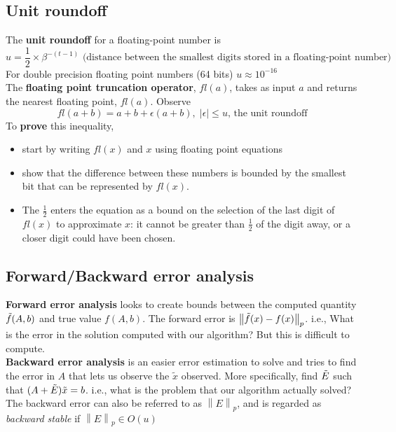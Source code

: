 \documentclass{article}
\newcommand{\norm}[2]{\left\lVert#1\right\rVert_#2}
\newcommand{\abs}[1]{\lvert#1\rvert}
\begin{document}
\subsection{Unit roundoff}
The \textbf{unit roundoff} for a floating-point number is 
\begin{equation*}
    u = \frac{1}{2} \times \beta^{-(t-1)} \textrm{ (distance between the smallest digits stored in a floating-point number)}
\end{equation*}
For double precision floating point numbers (64 bits) $u \approx 10^{-16}$\\
The \textbf{floating point truncation operator}, $fl(a)$, takes as input $a$ and returns the nearest floating point, $fl(a)$. Observe
\begin{equation*}
    fl(a+b) = a+b + \epsilon(a+b), \; \abs{\epsilon} \leq u \textrm{, the unit roundoff}
\end{equation*}
To \textbf{prove} this inequality, 
\begin{itemize} 
    \item start by writing $fl(x)$ and $x$ using floating point equations
    \item show that the difference between these numbers is bounded by the smallest bit that can be represented by $fl(x)$. 
    \item The $\frac{1}{2}$ enters the equation as a bound on the selection of the last digit of $fl(x)$ to approximate $x$: it cannot be greater than $\frac{1}{2}$ of the digit away, or a closer digit could have been chosen.
\end{itemize}

\subsection{Forward/Backward error analysis}
\textbf{Forward error analysis} looks to create bounds between the computed quantity $\Tilde{f}(A, b)$ and true value $f(A,b)$. The forward error is $\norm{\Tilde{f}(x) - f(x)}{p}$. i.e., What is the error in the solution computed with our algorithm? But this is difficult to compute.\\

\textbf{Backward error analysis} is an easier error estimation to solve and tries to find the error in $A$ that lets us observe the $\tilde{x}$ observed. More specifically, find $\Tilde{E}$ such that $(A + \Tilde{E})\tilde{x} = b$. i.e., what is the problem that our algorithm actually solved? The backward error can also be referred to as $\norm{E}{p}$, and is regarded as \textit{backward stable} if $\norm{E}{p} \in O(u)$ \\
\end{document}
